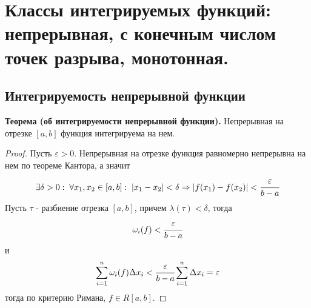 \documentclass{article}
\newcommand*{\theorem}[2]{\textbf{Теорема #1. } #2 \newline}
\newcommand*{\eps}{\varepsilon}
\begin{document}
\section{Классы интегрируемых функций: непрерывная, с конечным числом точек разрыва, монотонная.}
\subsection{Интегрируемость непрерывной функции}
\theorem{(об интегрируемости непрерывной функции)}{Непрерывная на отрезке $[a, b]$ функция интегрируема на нем.}
\begin{proof}
    Пусть $\eps > 0$. Непрерывная на отрезке функция равномерно непрерывна на нем по теореме Кантора, а значит 
    $$
        \exists \delta > 0: \; \forall x_1, x_2 \in [a, b]: \; |x_1 - x_2| < \delta \Rightarrow |f(x_1) - f(x_2)| < \cfrac{\eps}{b - a}
    $$
    Пусть $\tau$ - разбиение отрезка $[a, b]$, причем $\lambda(\tau) < \delta$, тогда
    $$
        \omega_i(f) < \cfrac{\eps}{b - a}
    $$
    и 
    $$
        \sum_{i = 1}^{n} \omega_i(f) \Delta x_i < \cfrac{\eps}{b - a}\sum_{i = 1}^{n} \Delta x_i = \eps
    $$
    тогда по критерию Римана, $f \in R[a, b]$.
\end{proof}
\end{document}

